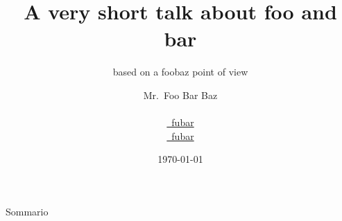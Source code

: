 \documentclass[trans]{beamer}
\title[Short Title]{A very short talk about foo and bar}
\subtitle{based on a foobaz point of view}
\author[Mr.~FooBaz]{ %
  Mr.~Foo Bar Baz \\  %
  \email{\mail~foo@bar.bz} \\ %
  \href{http://twitter.com/fubar}{\twitter~fubar} \\ %
  \href{http://it.linkedin.com/in/fubar/}{\linkedin~fubar} %
}
\date{
  \vspace{1em}
  \today
}
\begin{document}
{
  \begin{frame}[plain]
    \vspace{12em}
    \begin{titleBox}
      \maketitle
    \end{titleBox}
  \end{frame}
}

\begin{frame}{Sommario}
	\tableofcontents
\end{frame}


\end{document}
